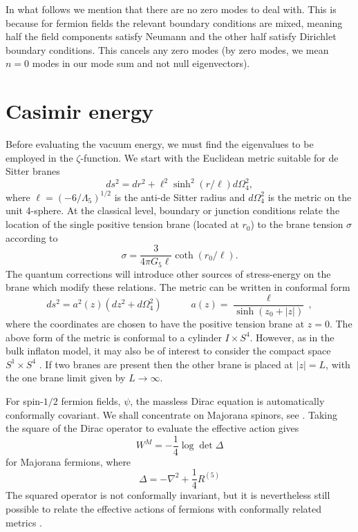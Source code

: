 \documentclass[a4paper,a4paper]{article}
\begin{document}
In what follows we mention that there 
are no zero modes to deal with. This is because for fermion fields the relevant 
boundary conditions are mixed, meaning half the field components satisfy Neumann 
and the other half satisfy Dirichlet boundary conditions. This cancels any zero modes 
(by zero modes, we mean $n=0$ modes in our mode sum and not null eigenvectors).

\section{Casimir energy}

Before evaluating the vacuum energy, we must find the eigenvalues to be 
employed in the $\zeta$-function.
We start with the Euclidean metric suitable for de Sitter branes \cite{GS}
\begin{equation}
ds^2 =dr^2+\ell^2\sinh^2(r/\ell)d\Omega^2_4,
\label{orig}
\end{equation}
where $\ell=(-6/\Lambda_5)^{1/2}$ is the anti-de Sitter radius and
$d\Omega_4^2$ is the metric on the unit 4-sphere.
At the classical level, boundary or junction conditions relate the location of the 
single positive tension brane (located at $r_0$) to the brane 
tension $\sigma$ according to \cite{GS}
\begin{equation}
\sigma=\frac{3}{4\pi G_5 \ell}\coth(r_0/\ell).
\end{equation}
The quantum corrections will introduce other sources of stress-energy on the
brane which modify these relations. The metric can be written in conformal 
form
\begin{equation}
ds^2 =a^2(z)(dz^2+d\Omega^2_4)
\quad\qquad a(z)=\frac{\ell}{\sinh(z_0+|z|)}\,,
\label{metric}
\end{equation}
where the coordinates are chosen to have the positive tension brane at $z=0$.
The above form of the metric is conformal to a cylinder $I\times S^4$.
However, as in the bulk inflaton model, it may also be of interest to consider the 
compact space $S^1\times S^4$ \cite{GS}. If two branes are present then 
the other brane is placed at $|z|=L$, with the one brane limit given by 
$L\rightarrow \infty$.


For spin-$1/2$ fermion fields, $\psi$, the massless Dirac equation is 
automatically conformally covariant. We shall concentrate on Majorana spinors, 
see \cite{MNSS}. Taking the square of the Dirac operator to evaluate the effective 
action gives
\begin{equation}
W^M=-\frac14\log\det\Delta
\end{equation}
for Majorana fermions, where
\begin{equation}
\Delta=-\nabla^2+\frac14{}R^{(5)}
\end{equation}
The squared operator is not conformally invariant, but it is nevertheless 
still possible to relate the effective actions of fermions with conformally 
related metrics \cite{MOSS2}.
\end{document}
